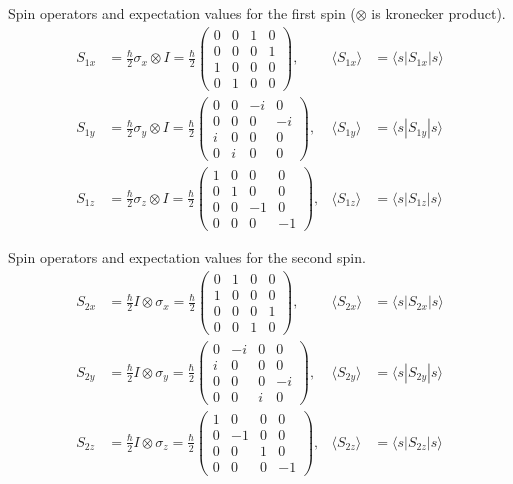 Spin operators and expectation values for the first spin
($\otimes$ is kronecker product).
\begin{align*}
S_{1x}&=\frac{\hbar}{2}\sigma_x\otimes I=\frac{\hbar}{2}
\begin{pmatrix}
0&0&1&0\\
0&0&0&1\\
1&0&0&0\\
0&1&0&0
\end{pmatrix}, & \langle S_{1x}\rangle&=\langle s|S_{1x}|s\rangle
\\
S_{1y}&=\frac{\hbar}{2}\sigma_y\otimes I=\frac{\hbar}{2}
\begin{pmatrix}
0&0&-i&0\\
0&0&0&-i\\
i&0&0&0\\
0&i&0&0
\end{pmatrix}, & \langle S_{1y}\rangle&=\langle s|S_{1y}|s\rangle
\\
S_{1z}&=\frac{\hbar}{2}\sigma_z\otimes I=\frac{\hbar}{2}
\begin{pmatrix}
1&0&0&0\\
0&1&0&0\\
0&0&-1&0\\
0&0&0&-1
\end{pmatrix}, & \langle S_{1z}\rangle&=\langle s|S_{1z}|s\rangle
\end{align*}

Spin operators and expectation values for the second spin.
\begin{align*}
S_{2x}&=\frac{\hbar}{2}I\otimes\sigma_x=\frac{\hbar}{2}
\begin{pmatrix}
0&1&0&0\\
1&0&0&0\\
0&0&0&1\\
0&0&1&0
\end{pmatrix}, & \langle S_{2x}\rangle&=\langle s|S_{2x}|s\rangle
\\
S_{2y}&=\frac{\hbar}{2}I\otimes\sigma_y=\frac{\hbar}{2}
\begin{pmatrix}
0&-i&0&0\\
i&0&0&0\\
0&0&0&-i\\
0&0&i&0
\end{pmatrix}, & \langle S_{2y}\rangle&=\langle s|S_{2y}|s\rangle
\\
S_{2z}&=\frac{\hbar}{2}I\otimes\sigma_z=\frac{\hbar}{2}
\begin{pmatrix}
1&0&0&0\\
0&-1&0&0\\
0&0&1&0\\
0&0&0&-1
\end{pmatrix}, & \langle S_{2z}\rangle&=\langle s|S_{2z}|s\rangle
\end{align*}

